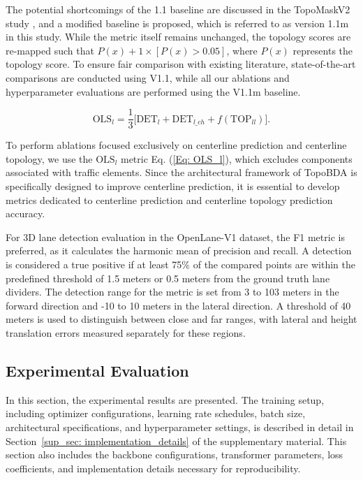 The potential shortcomings of the 1.1 baseline are discussed in the TopoMaskV2 study \cite{kalfaoglu2024topomaskv2}, and a modified baseline is proposed, which is referred to as version 1.1m in this study. While the metric itself remains unchanged, the topology scores are re-mapped such that $P(x) + 1 \times [P(x) > 0.05]$, where $P(x)$ represents the topology score. To ensure fair comparison with existing literature, state-of-the-art comparisons are conducted using V1.1, while all our ablations and hyperparameter evaluations are performed using the V1.1m baseline.


\begin{equation}
\label{Eq: OLS_l}
    \text{OLS}_{l} = \frac{1}{3} \bigg[ \text{DET}_{l} + \text{DET}_{l\_ch} + f(\text{TOP}_{ll}) \bigg].
\end{equation}

To perform ablations focused exclusively on centerline prediction and centerline topology, we use the $\text{OLS}_{l}$ metric Eq. (\ref{Eq: OLS_l}), which excludes components associated with traffic elements. Since the architectural framework of TopoBDA is specifically designed to improve centerline prediction, it is essential to develop metrics dedicated to centerline prediction and centerline topology prediction accuracy.

For 3D lane detection evaluation in the OpenLane-V1 dataset, the F1 metric is preferred, as it calculates the harmonic mean of precision and recall. A detection is considered a true positive if at least 75\% of the compared points are within the predefined threshold of 1.5 meters or 0.5 meters from the ground truth lane dividers. The detection range for the metric is set from 3 to 103 meters in the forward direction and -10 to 10 meters in the lateral direction. A threshold of 40 meters is used to distinguish between close and far ranges, with lateral and height translation errors measured separately for these regions.


\subsection{Experimental Evaluation}
\label{sec: experiments}

In this section, the experimental results are presented. The training setup, including optimizer configurations, learning rate schedules, batch size, architectural specifications, and hyperparameter settings, is described in detail in Section~\ref{sup_sec: implementation_details} of the supplementary material. This section also includes the backbone configurations, transformer parameters, loss coefficients, and implementation details necessary for reproducibility.

